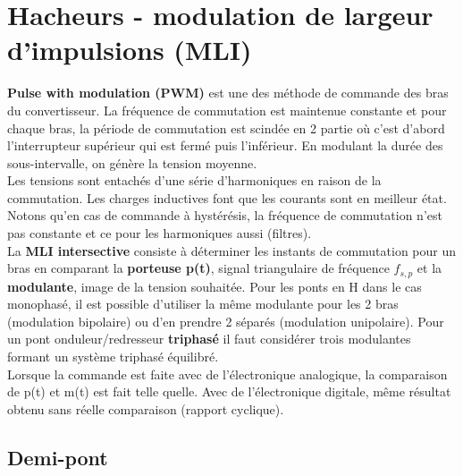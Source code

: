 \section{Hacheurs - modulation de largeur d'impulsions (MLI)}
	 \textbf{Pulse with modulation (PWM)} est une des méthode de commande des bras du convertisseur. La fréquence de commutation est maintenue constante et pour chaque bras, la période de commutation est scindée en 2 partie où c'est d'abord l'interrupteur supérieur qui est fermé puis l'inférieur. En modulant la durée des sous-intervalle, on génère la tension moyenne. \\
	 Les tensions sont entachés d'une série d'harmoniques en raison de la commutation. Les charges inductives font que les courants sont en meilleur état. Notons qu'en cas de commande à hystérésis, la fréquence de commutation n'est pas constante et ce pour les harmoniques aussi (filtres). \\
	 La \textbf{MLI intersective} consiste à déterminer les instants de commutation pour un bras en comparant la \textbf{porteuse p(t)}, signal triangulaire de fréquence $f_{s,p}$ et la \textbf{modulante}, image de la tension souhaitée. Pour les ponts en H dans le cas monophasé, il est possible d'utiliser la même modulante pour les 2 bras (modulation bipolaire) ou d'en prendre 2 séparés (modulation unipolaire). Pour un pont onduleur/redresseur \textbf{triphasé} il faut considérer trois modulantes formant un système triphasé équilibré. \\
	 Lorsque la commande est faite avec de l'électronique analogique, la comparaison de p(t) et m(t) est fait telle quelle. Avec de l'électronique digitale, même résultat obtenu sans réelle comparaison (rapport cyclique). 
	 
	 \subsection{Demi-pont}
